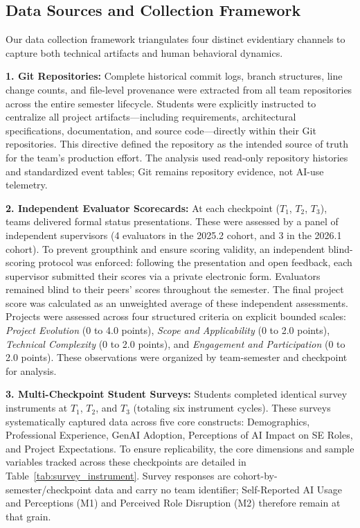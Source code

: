 
\subsection{Data Sources and Collection Framework}
\label{sec:data-sources}
Our data collection framework triangulates four distinct evidentiary channels to capture both technical artifacts and human behavioral dynamics.

\textbf{1. Git Repositories:} Complete historical commit logs, branch structures, line change counts, and file-level provenance were extracted from all team repositories across the entire semester lifecycle. Students were explicitly instructed to centralize all project artifacts---including requirements, architectural specifications, documentation, and source code---directly within their Git repositories. This directive defined the repository as the intended source of truth for the team's production effort. The analysis used read-only repository histories and standardized event tables; Git remains repository evidence, not AI-use telemetry.

\textbf{2. Independent Evaluator Scorecards:} At each checkpoint ($T_1$, $T_2$, $T_3$), teams delivered formal status presentations. These were assessed by a panel of independent supervisors (4 evaluators in the 2025.2 cohort, and 3 in the 2026.1 cohort). To prevent groupthink and ensure scoring validity, an independent blind-scoring protocol was enforced: following the presentation and open feedback, each supervisor submitted their scores via a private electronic form. Evaluators remained blind to their peers' scores throughout the semester. The final project score was calculated as an unweighted average of these independent assessments. Projects were assessed across four structured criteria on explicit bounded scales: \emph{Project Evolution} (0 to 4.0 points), \emph{Scope and Applicability} (0 to 2.0 points), \emph{Technical Complexity} (0 to 2.0 points), and \emph{Engagement and Participation} (0 to 2.0 points). These observations were organized by team-semester and checkpoint for analysis.

\textbf{3. Multi-Checkpoint Student Surveys:} Students completed identical survey instruments at $T_1$, $T_2$, and $T_3$ (totaling six instrument cycles). These surveys systematically captured data across five core constructs: Demographics, Professional Experience, GenAI Adoption, Perceptions of AI Impact on SE Roles, and Project Expectations. To ensure replicability, the core dimensions and sample variables tracked across these checkpoints are detailed in Table~\ref{tab:survey_instrument}. Survey responses are cohort-by-semester/checkpoint data and carry no team identifier; Self-Reported AI Usage and Perceptions (M1) and Perceived Role Disruption (M2) therefore remain at that grain.

